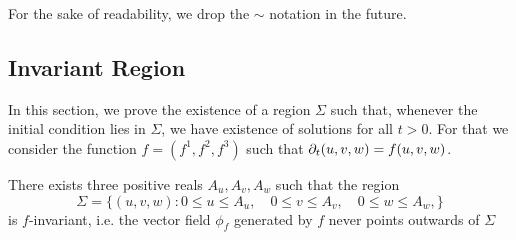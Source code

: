 For the sake of readability, we drop the $\sim$ notation in the future.

\subsection{Invariant Region}

In this section, we prove the existence of a region $\Sigma$ such that, whenever the initial condition lies in $\Sigma$, we have existence of solutions for all $t > 0$. For that we consider the function $f = (f^1, f^2, f^3)$ such that $\partial_t (u, v, w) = f(u, v, w)$.

\begin{lemma}
	There exists three positive reals $A_u, A_v, A_w$ such that the region $$\Sigma = \bigl\{(u, v, w) : 0 \le u \le A_u, \quad 0 \le v \le A_v, \quad  0 \le w \le A_w, \bigr\}$$ is $f$-invariant, i.e. the vector field $\phi_f$ generated by $f$ never points outwards of $\Sigma$
\end{lemma}

